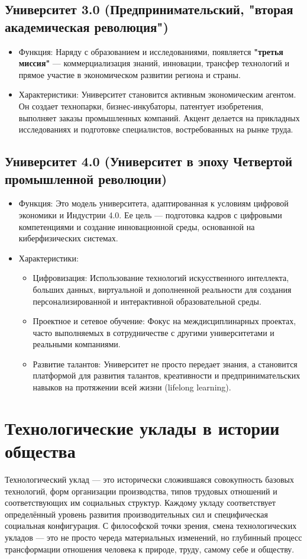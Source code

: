\documentclass[12pt,a4paper]{article}
\begin{document}
	\subsection{Университет 3.0 (Предпринимательский, "вторая академическая революция")}
	\begin{itemize}
		\item Функция: Наряду с образованием и исследованиями, появляется \textbf{"третья миссия"} --- коммерциализация знаний, инновации, трансфер технологий и прямое участие в экономическом развитии региона и страны.
		\item Характеристики: Университет становится активным экономическим агентом. Он создает технопарки, бизнес-инкубаторы, патентует изобретения, выполняет заказы промышленных компаний. Акцент делается на прикладных исследованиях и подготовке специалистов, востребованных на рынке труда.
	\end{itemize}
	
	\subsection{Университет 4.0 (Университет в эпоху Четвертой промышленной революции)}
	\begin{itemize}
		\item Функция: Это модель университета, адаптированная к условиям цифровой экономики и Индустрии 4.0. Ее цель --- подготовка кадров с цифровыми компетенциями и создание инновационной среды, основанной на киберфизических системах.
		\item Характеристики:
		\begin{itemize}
			\item Цифровизация: Использование технологий искусственного интеллекта, больших данных, виртуальной и дополненной реальности для создания персонализированной и интерактивной образовательной среды.
			\item Проектное и сетевое обучение: Фокус на междисциплинарных проектах, часто выполняемых в сотрудничестве с другими университетами и реальными компаниями.
			\item Развитие талантов: Университет не просто передает знания, а становится платформой для развития талантов, креативности и предпринимательских навыков на протяжении всей жизни (lifelong learning).
		\end{itemize}
	\end{itemize}
	
	\section{Технологические уклады в истории общества~\checkmark}
	Технологический уклад — это исторически сложившаяся совокупность базовых технологий, форм организации производства, типов трудовых отношений и соответствующих им социальных структур. Каждому укладу соответствует определённый уровень развития производительных сил и специфическая социальная конфигурация. С философской точки зрения, смена технологических укладов — это не просто череда материальных изменений, но глубинный процесс трансформации отношения человека к природе, труду, самому себе и обществу.
	
\end{document}
